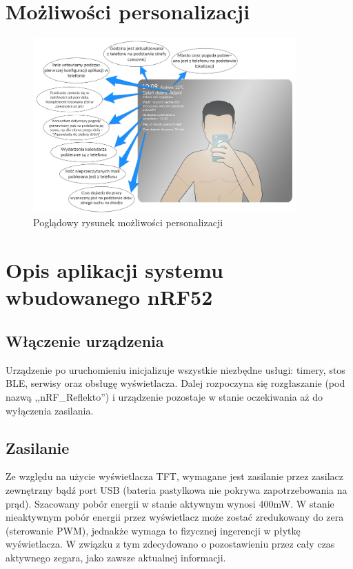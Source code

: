 \documentclass[a4paper,11pt]{article}
\begin{document}
\section{Możliwości personalizacji}
\begin{figure}[H]
	\includegraphics[width=0.9\textwidth,center]{dymki_kreski.png}
	\caption {Poglądowy rysunek możliwości personalizacji}
	\label{lustro_konf}
\end{figure}

\section{Opis aplikacji systemu wbudowanego nRF52}
\subsection{Włączenie urządzenia}
Urządzenie po uruchomieniu inicjalizuje wszystkie niezbędne usługi: timery, stos BLE, serwisy oraz obsługę wyświetlacza. Dalej rozpoczyna się rozgłaszanie (pod nazwą ,,nRF\_Reflekto'') i urządzenie pozostaje w stanie oczekiwania aż do wyłączenia zasilania. 

\subsection{Zasilanie}
Ze względu na użycie wyświetlacza TFT, wymagane jest zasilanie przez zasilacz zewnętrzny bądź port USB (bateria pastylkowa nie pokrywa zapotrzebowania na prąd). Szacowany pobór energii w stanie aktywnym wynosi 400mW. W stanie nieaktywnym pobór energii przez wyświetlacz może zostać zredukowany do zera (sterowanie PWM), jednakże wymaga to fizycznej ingerencji w płytkę wyświetlacza. W związku z tym zdecydowano o pozostawieniu przez cały czas aktywnego zegara, jako zawsze aktualnej informacji.
\end{document}
